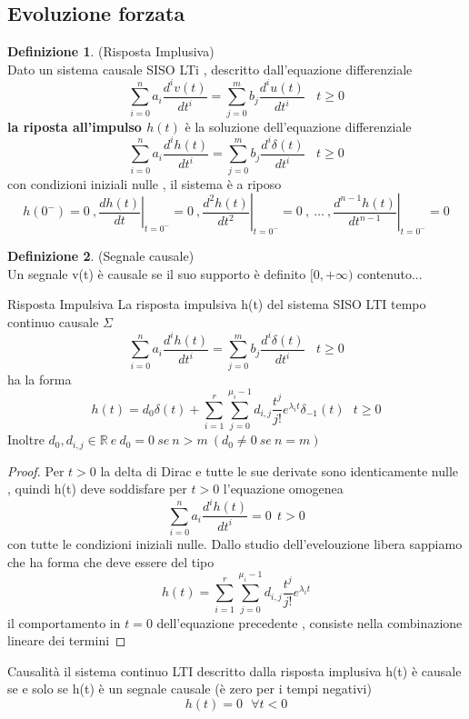 \documentclass{article}
\theoremstyle{definition}
\newtheorem*{definizione}{Definizione}
\newcommand{\R}{\mathbb{R}}
\newcommand{\la}{\lambda}
\begin{document}
	\subsection{Evoluzione forzata}
	\begin{definizione}(Risposta Implusiva)\\
		Dato un sistema causale SISO LTi , descritto dall'equazione differenziale 
		$$\sum_{i=0}^{n}a_i \frac{d^i v(t)}{dt^i}=\sum_{j=0}^{m}b_j \frac{d^i u(t)}{dt^i}  \ \ \ \ t \geq 0	$$ \textbf{la riposta all'impulso $h(t)$} è la soluzione dell'equazione differenziale   
		$$\sum_{i=0}^{n}a_i \frac{d^i h(t)}{dt^i}=\sum_{j=0}^{m}b_j \frac{d^i \delta(t)}{dt^i}  \ \ \ \ t \geq 0	$$
		con condizioni iniziali nulle , il sistema è a riposo 
		$$h\left(0^{-}\right)=0\ ,\left.\frac{d h(t)}{d t}\right|_{t=0^{-}}=0 \ ,\left.\frac{d^2 h(t)}{d t^2}\right|_{t=0^{-}}=0\ ,\  \ldots \ ,\left.\frac{d^{n-1} h(t)}{d t^{n-1}}\right|_{t=0^{-}}=0
		$$ 
	\end{definizione}
	\begin{definizione}(Segnale causale)\\
		Un segnale v(t) è causale se il suo supporto  è definito $[0,+\infty )$
		contenuto...
	\end{definizione}
	\begin{teo}{Risposta Impulsiva}{}{}
		La risposta impulsiva h(t) del sistema SISO LTI tempo continuo causale  $\Sigma$
		$$\sum_{i=0}^{n}a_i \frac{d^i h(t)}{dt^i}=\sum_{j=0}^{m}b_j \frac{d^i \delta(t)}{dt^i}  \ \ \ \ t \geq 0	$$
		ha la forma 
		$$h(t)=d_0 \delta(t)+\sum_{i=1}^{r}\sum_{j=0}^{\mu_i-1}d_{i,j}\frac{t^j}{j!}e^{\la_i t}\delta_{-1}(t) \ \ \ t \geq 0$$
		Inoltre $d_0 , d_{i,j} \in \R \ e \ d_0=0 \ se \ n > m \ (d_0\neq 0 \ se \ n=m)$
	\end{teo}
	\begin{proof}
		Per $t>0$ la delta di Dirac e tutte le sue derivate sono identicamente nulle , quindi h(t) deve soddisfare per $t >0$ l'equazione omogenea 
		$$\sum_{i=0}^n a_i \frac{d^i h(t)}{dt^i}=0 \ \ t > 0$$ con tutte le condizioni iniziali nulle. Dallo studio dell'evelouzione libera sappiamo che ha forma che deve essere del tipo 
		$$h(t)=\sum_{i=1}^{r}\sum_{j=0}^{\mu_i-1}d_{i,j}\frac{t^j}{j!}e^{\la_i t}$$ il comportamento in $t=0$ dell'equazione precedente , consiste nella combinazione lineare dei termini 
	\end{proof}
	\begin{teo}{Causalità}{}
	il sistema continuo LTI descritto dalla risposta implusiva h(t) è causale se e solo se h(t) è un segnale causale (è zero per i tempi negativi) $$h(t)=0 \ \ \  \forall t < 0$$
	\end{teo}
\end{document}
